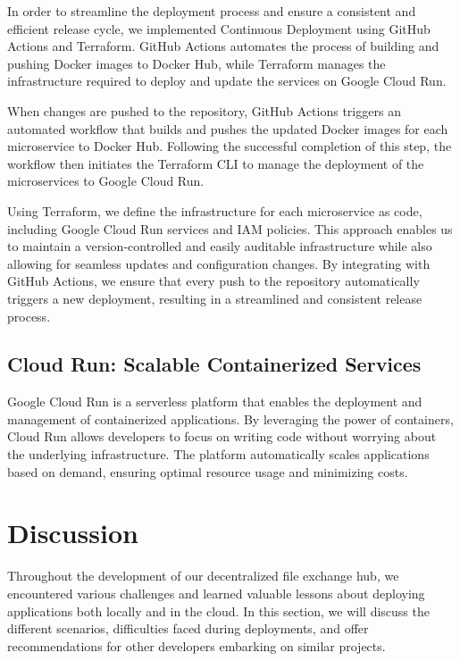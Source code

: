\documentclass[a4paper,fleqn]{cas-dc}
\begin{document}
In order to streamline the deployment process and ensure a consistent and efficient release cycle, we implemented Continuous Deployment using GitHub Actions and Terraform. GitHub Actions automates the process of building and pushing Docker images to Docker Hub, while Terraform manages the infrastructure required to deploy and update the services on Google Cloud Run.

When changes are pushed to the repository, GitHub Actions triggers an automated workflow that builds and pushes the updated Docker images for each microservice to Docker Hub. Following the successful completion of this step, the workflow then initiates the Terraform CLI to manage the deployment of the microservices to Google Cloud Run.

Using Terraform, we define the infrastructure for each microservice as code, including Google Cloud Run services and IAM policies. This approach enables us to maintain a version-controlled and easily auditable infrastructure while also allowing for seamless updates and configuration changes. By integrating with GitHub Actions, we ensure that every push to the repository automatically triggers a new deployment, resulting in a streamlined and consistent release process.

\subsection{Cloud Run: Scalable Containerized Services}

Google Cloud Run is a serverless platform that enables the deployment and management of containerized applications. By leveraging the power of containers, Cloud Run allows developers to focus on writing code without worrying about the underlying infrastructure. The platform automatically scales applications based on demand, ensuring optimal resource usage and minimizing costs.

\section{Discussion} \label{sec:discussion}

Throughout the development of our decentralized file exchange hub, we encountered various challenges and learned valuable lessons about deploying applications both locally and in the cloud. In this section, we will discuss the different scenarios, difficulties faced during deployments, and offer recommendations for other developers embarking on similar projects.
\end{document}

